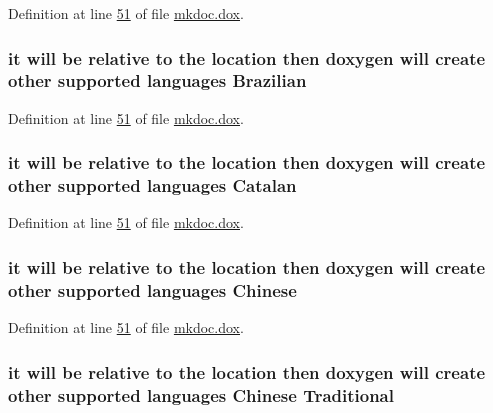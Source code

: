 Definition at line \hyperlink{mkdoc_8dox_source_l00051}{51} of file \hyperlink{mkdoc_8dox_source}{mkdoc.\-dox}.

\hypertarget{mkdoc_8dox_a8e7728ba488d59bc2d1023e8f1325f11}{
\subsubsection[{Brazilian}]{\setlength{\rightskip}{0pt plus 5cm}it will be relative to the location then doxygen will create other supported languages Brazilian}}\label{mkdoc_8dox_a8e7728ba488d59bc2d1023e8f1325f11}


Definition at line \hyperlink{mkdoc_8dox_source_l00051}{51} of file \hyperlink{mkdoc_8dox_source}{mkdoc.\-dox}.

\hypertarget{mkdoc_8dox_ab887b26d09c2ec0872c1e14e2f928a64}{
\subsubsection[{Catalan}]{\setlength{\rightskip}{0pt plus 5cm}it will be relative to the location then doxygen will create other supported languages Catalan}}\label{mkdoc_8dox_ab887b26d09c2ec0872c1e14e2f928a64}


Definition at line \hyperlink{mkdoc_8dox_source_l00051}{51} of file \hyperlink{mkdoc_8dox_source}{mkdoc.\-dox}.

\hypertarget{mkdoc_8dox_ab6ff97d2e5e9fa61c208d5f0eee91c62}{
\subsubsection[{Chinese}]{\setlength{\rightskip}{0pt plus 5cm}it will be relative to the location then doxygen will create other supported languages Chinese}}\label{mkdoc_8dox_ab6ff97d2e5e9fa61c208d5f0eee91c62}


Definition at line \hyperlink{mkdoc_8dox_source_l00051}{51} of file \hyperlink{mkdoc_8dox_source}{mkdoc.\-dox}.

\hypertarget{mkdoc_8dox_ab1a4445cb897e49c113c5a2eff77118a}{
\subsubsection[{Traditional}]{\setlength{\rightskip}{0pt plus 5cm}it will be relative to the location then doxygen will create other supported languages {\bf Chinese} Traditional}}\label{mkdoc_8dox_ab1a4445cb897e49c113c5a2eff77118a}


